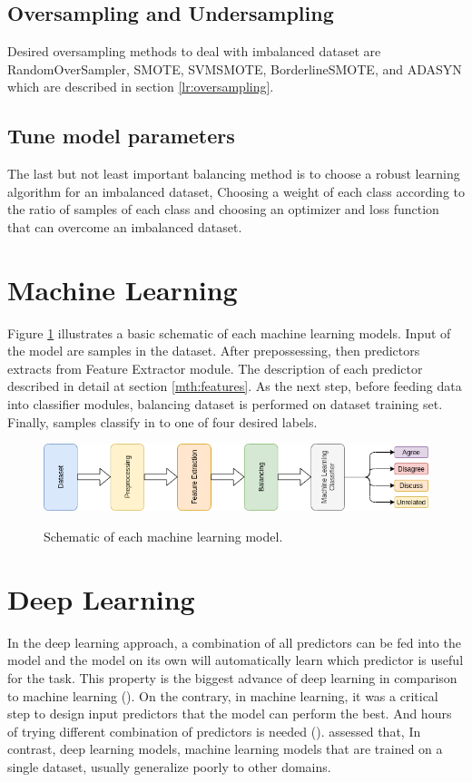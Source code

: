 \subsection{Oversampling and Undersampling}
 Desired oversampling methods to deal with imbalanced dataset are RandomOverSampler, SMOTE, SVMSMOTE, BorderlineSMOTE, and ADASYN which are described in section \ref{lr:oversampling}. 

\subsection{Tune model parameters}
 The last but not least important balancing method is to choose a robust learning algorithm for an imbalanced dataset, Choosing a weight of each class according to the ratio of samples of each class and choosing an optimizer and loss function that can overcome an imbalanced dataset.

\section{Machine Learning}
\label{mth:ml}
Figure \ref{fig:mlschm} illustrates a basic schematic of each machine learning models. Input of the model are samples in the dataset. After prepossessing, then predictors extracts from Feature Extractor module. The description of each predictor described in detail at section \ref{mth:features}. As the next step, before feeding data into classifier modules, balancing dataset is performed on dataset training set. Finally, samples classify in to one of four desired labels. 
\begin{figure}%
	\centering
	{\includegraphics[width=14.5cm]{statistics/schema/ml.png} }
	\caption{Schematic of each machine learning model.}%
	\label{fig:mlschm}%
\end{figure}


\section{Deep Learning}
\label{mth:dl}
In the deep learning approach, a combination of all predictors can be fed into the model and the model on its own will automatically learn which predictor is useful for the task. This property is the biggest advance of deep learning in comparison to machine learning (\cite{book_datafake}). On the contrary, in machine learning, it was a critical step to design input predictors that the model can perform the best. And hours of trying different combination of predictors is needed (\cite{book_fake}). \cite{stance_robust} assessed that, In contrast, deep learning models, machine learning models that are trained on a single dataset, usually generalize poorly to other domains.

